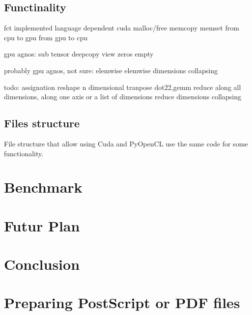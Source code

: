 \documentclass{article} %
\begin{document}
\subsection{Functinality}
fct implemented language dependent
cuda
malloc/free
memcopy
memset
from cpu to gpu
from gpu to cpu

gpu agnos:
sub tensor
deepcopy
view
zeros
empty

probably gpu agnos, not sure:
elemwise
elemwise dimensions collapsing


todo:
assignation
reshape
n dimensional tranpose
dot22,gemm
reduce along all dimensions, along one axis or a list of dimensions
reduce dimensions collapsing

\subsection{Files structure}
File structure that allow using Cuda and PyOpenCL use the same code for some functionality.

\section{Benchmark}
\section{Futur Plan}
\section{Conclusion}


\section{Preparing PostScript or PDF files}

% 
% 
\end{document}
